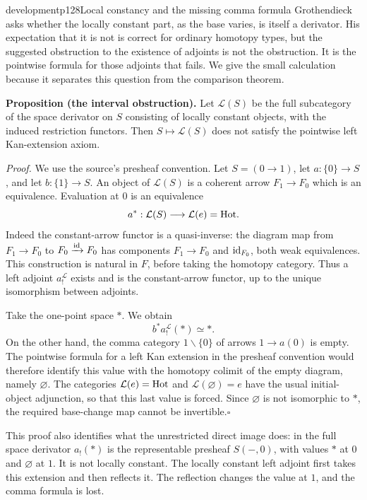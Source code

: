 \begin{dcomment}{development}{p128}{Local constancy and the missing comma formula}
Grothendieck asks whether the locally constant part, as the base varies, is itself a derivator. His expectation that it is not is correct for ordinary homotopy types, but the suggested obstruction to the existence of adjoints is not the obstruction. It is the pointwise formula for those adjoints that fails. We give the small calculation because it separates this question from the comparison theorem.

\textbf{Proposition (the interval obstruction).}\ours
Let $\mathcal L(S)$ be the full subcategory of the space derivator on $S$ consisting of locally constant objects, with the induced restriction functors. Then $S\mapsto\mathcal L(S)$ does not satisfy the pointwise left Kan-extension axiom.

\textit{Proof.} We use the source's presheaf convention. Let $S=(0\to1)$, let $a:\{0\}\to S$, and let $b:\{1\}\to S$. An object of $\mathcal L(S)$ is a coherent arrow $F_1\to F_0$ which is an equivalence. Evaluation at $0$ is an equivalence
\[
 a^*:\mathcal L(S)\longrightarrow\mathcal L(e)=\mathrm{Hot}.
\]
Indeed the constant-arrow functor is a quasi-inverse: the diagram map from $F_1\to F_0$ to $F_0\xrightarrow{\mathrm{id}}F_0$ has components $F_1\to F_0$ and $\mathrm{id}_{F_0}$, both weak equivalences. This construction is natural in $F$, before taking the homotopy category. Thus a left adjoint $a^{\mathcal L}_!$ exists and is the constant-arrow functor, up to the unique isomorphism between adjoints.

Take the one-point space $*$. We obtain
\[
 b^*a^{\mathcal L}_!(*)\simeq *.
\]
On the other hand, the comma category $1\backslash\{0\}$ of arrows $1\to a(0)$ is empty. The pointwise formula for a left Kan extension in the presheaf convention would therefore identify this value with the homotopy colimit of the empty diagram, namely $\varnothing$. The categories $\mathcal L(e)=\mathrm{Hot}$ and $\mathcal L(\varnothing)=e$ have the usual initial-object adjunction, so that this last value is forced. Since $\varnothing$ is not isomorphic to $*$, the required base-change map cannot be invertible.\hfill$\square$

This proof also identifies what the unrestricted direct image does: in the full space derivator $a_!(*)$ is the representable presheaf $S(-,0)$, with values $*$ at $0$ and $\varnothing$ at $1$. It is not locally constant. The locally constant left adjoint first takes this extension and then reflects it. The reflection changes the value at $1$, and the comma formula is lost.


\end{dcomment}
